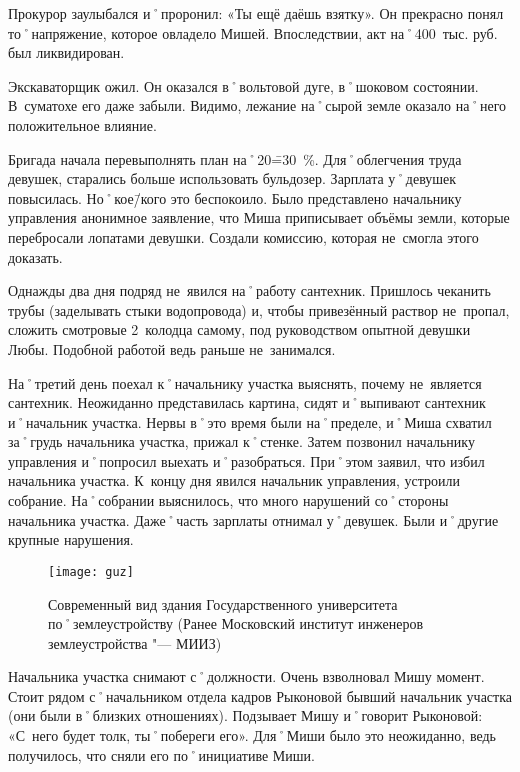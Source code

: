 Прокурор заулыбался и˚проронил: «Ты ещё даёшь взятку». Он прекрасно понял то˚напряжение, которое овладело Мишей. Впоследствии, акт на˚400~тыс. руб. был ликвидирован.

Экскаваторщик ожил. Он оказался в˚вольтовой дуге, в˚шоковом состоянии. В~суматохе его даже забыли. Видимо, лежание на˚сырой земле оказало на˚него положительное влияние. 

Бригада начала перевыполнять план на˚20\==30~\%. Для˚облегчения труда девушек, старались больше использовать бульдозер. Зарплата у˚девушек повысилась. Но˚кое\=/кого это беспокоило. Было представлено начальнику управления анонимное заявление, что Миша приписывает объёмы земли, которые перебросали лопатами девушки. Создали комиссию, которая не~смогла этого доказать.

Однажды два дня подряд не~явился на˚работу сантехник. Пришлось чеканить трубы (заделывать стыки водопровода) и, чтобы привезённый раствор не~пропал, сложить смотровые 2~колодца самому, под руководством опытной девушки Любы. Подобной работой ведь раньше не~занимался.

На˚третий день поехал к˚начальнику участка выяснять, почему не~является сантехник. Неожиданно представилась картина, сидят и˚выпивают сантехник и˚начальник участка. Нервы в˚это время были на˚пределе, и˚Миша схватил за˚грудь начальника участка, прижал к˚стенке. Затем позвонил начальнику управления и˚попросил выехать и˚разобраться. При˚этом заявил, что избил начальника участка. К~концу дня явился начальник управления, устроили собрание. На˚собрании выяснилось, что много нарушений со˚стороны начальника участка. Даже˚часть зарплаты отнимал у˚девушек. Были и˚другие крупные нарушения.

\begin{wrapfigure}{O}{.4\textwidth}
\centering
\texttt{[image: guz]}
\caption[Современный вид здания Государственного университета по˚землеустройству (Ранее Московский институт инженеров землеустройства "--- МИИЗ)]{Современный вид здания Государственного университета по˚землеустройству (Ранее Московский институт инженеров землеустройства "--- МИИЗ)\footnotemark}
\label{fig:guz}
\end{wrapfigure}

Начальника участка снимают с˚должности. Очень взволновал Мишу момент. Стоит рядом с˚начальником отдела кадров Рыконовой бывший начальник участка (они были в˚близких отношениях). Подзывает Мишу и˚говорит Рыконовой: «С~него будет толк, ты˚побереги его». Для˚Миши было это неожиданно, ведь получилось, что сняли его по˚инициативе Миши. 


